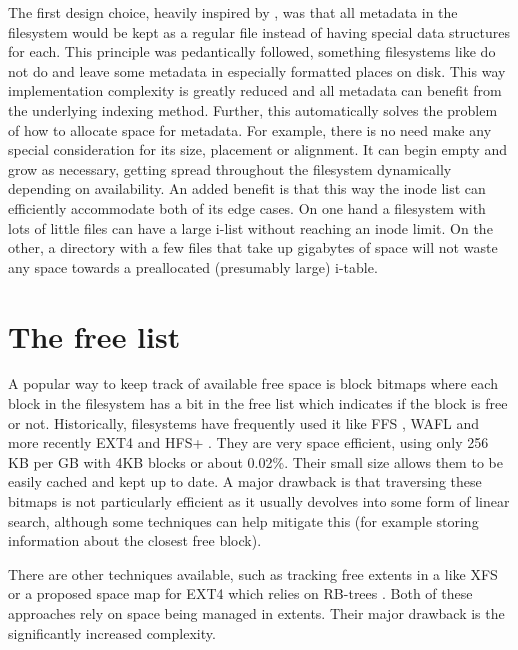         The first design choice, heavily inspired by , was
        that all metadata in the filesystem would be kept as a regular file
        instead of having special data structures for each. This principle was
        pedantically followed, something filesystems like 
        do not do and leave some metadata in especially formatted places on
        disk. This way implementation complexity is greatly reduced and all
        metadata can benefit from the underlying indexing method. Further, this
        automatically solves the problem of how to allocate space for metadata.
        For example, there is no need make any special consideration for its
        size, placement or alignment. It can begin empty and grow as necessary,
        getting spread throughout the filesystem dynamically depending on
        availability. An added benefit is that this way the inode list can
        efficiently accommodate both of its edge cases. On one hand a
        filesystem with lots of little files can have a large i-list without
        reaching an inode limit. On the other, a directory with a few files
        that take up gigabytes of space will not waste any space towards a
        preallocated (presumably large) i-table.

    \section{The free list}
        \label{sec:free_list}

        A popular way to keep track of available free space is block bitmaps
        where each block in the filesystem has a bit in the free list which
        indicates if the block is free or not. Historically, filesystems have
        frequently used it like FFS \cite{FFS}, WAFL \cite{WAFL} and more
        recently EXT4 \cite{ext4_space_maps} and HFS+ \cite{HFSplus}. They are
        very space efficient, using only 256 KB per GB with 4KB blocks or about
        0.02\%. Their small size allows them to be easily cached and kept up to
        date. A major drawback is that traversing these bitmaps is not
        particularly efficient as it usually devolves into some form of linear
        search, although some techniques can help mitigate this (for example
        storing information about the closest free block).

        There are other techniques available, such as tracking free extents in
        a \bplustree like XFS \cite{XFS_scalability} or a proposed space map
        for EXT4 which relies on RB-trees \cite{ext4_space_maps}. Both of these
        approaches rely on space being managed in extents. Their major drawback is
        the significantly increased complexity.

